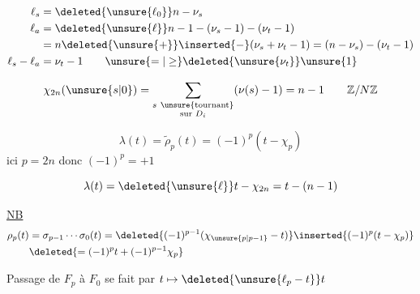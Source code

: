 \[
\begin{aligned}
\ell_s&=\deleted{\unsure{\ell_0}}n-\nu_s\\
\ell_a&=\deleted{\unsure{\ell}}n-1-(\nu_s-1)-(\nu_t-1)\\
&=n\deleted{\unsure{+}}\inserted{-}(\nu_s+\nu_t-1)=(n-\nu_s)-(\nu_t-1)\\
\ell_s-\ell_a&=\nu_t-1\qquad \unsure{=|\geq}\deleted{\unsure{\nu_t}}\unsure{1}
\end{aligned}
\]

\[
\chi_{2n}(\unsure{s|0})=\sum_{\substack{s\ \text{\unsure{tournant}}\\\text{sur }D_i}}(\nu(s)-1)=n-1
\qquad \mathbb Z/N\mathbb Z
\]

\[
\lambda(t)=\widetilde{\rho}_p(t)=(-1)^p(t-\chi_p)
\]
ici \(p=2n\) donc \((-1)^p=+1\)

\deleted{\unsure{\(\rho\)}}
\[
\lambda(t)=\deleted{\unsure{\ell}}t-\chi_{2n}=t-(n-1)
\]

\uline{NB}
\[
\begin{aligned}
\rho_p(t)&=\sigma_{p-1}\cdots\sigma_0(t)
=\deleted{(-1)^{p-1}(\chi_{\unsure{p|p-1}}-t)}\inserted{(-1)^p(t-\chi_p)}\\
&\deleted{=(-1)^p t+(-1)^{p-1}\chi_p}
\end{aligned}
\]

Passage de \(F_p\) à \(F_0\) se fait par \(t\mapsto\deleted{\unsure{\ell_p-t}}t\)

